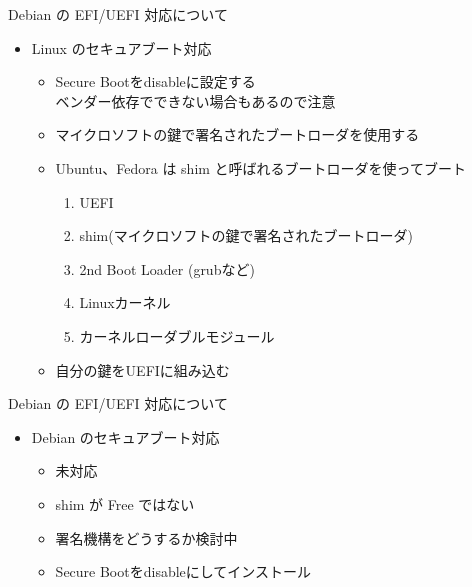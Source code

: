 \begin{frame}[containsverbatim]{Debian の EFI/UEFI 対応について}

\begin{itemize}
\item Linux のセキュアブート対応
\begin{itemize}
\item Secure Bootをdisableに設定する\\
ベンダー依存でできない場合もあるので注意
\item マイクロソフトの鍵で署名されたブートローダを使用する\\
\item Ubuntu、Fedora は shim と呼ばれるブートローダを使ってブート\\
\begin{enumerate}
\item UEFI
\item shim(マイクロソフトの鍵で署名されたブートローダ)
\item 2nd Boot Loader (grubなど)
\item Linuxカーネル
\item カーネルローダブルモジュール
\end{enumerate}
\item 自分の鍵をUEFIに組み込む
\end{itemize}
\end{itemize}

\end{frame}

\begin{frame}[containsverbatim]{Debian の EFI/UEFI 対応について}

\begin{itemize}
\item Debian のセキュアブート対応
\begin{itemize}
\item 未対応
\item shim が Free ではない
\item 署名機構をどうするか検討中
\item Secure Bootをdisableにしてインストール
\end{itemize}
\end{itemize}

\end{frame}



